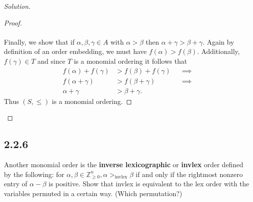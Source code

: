 \documentclass[]{article}
\newcommand\<{\langle}
\renewcommand\>{\rangle}
\newcommand{\ZZ}{\ensuremath{\mathbb{Z}}}
\newenvironment{solution}
{
	\begin{proof}[Solution] \text{ }
		\\
	}
	{
	\end{proof}
}
\begin{document}
\begin{solution}
\begin{proof}
		\\
		\\
		Finally, we show that if $\alpha, \beta, \gamma \in A$ with $\alpha > \beta$ then $\alpha + \gamma > \beta + \gamma$. Again by definition of an order embedding, we must have $f(\alpha) > f(\beta)$. Additionally, $f(\gamma) \in T$ and since $T$ is a monomial ordering it follows that
		\begin{align*}
			f(\alpha) + f(\gamma) &> f(\beta) + f(\gamma) &&\implies \\
			f(\alpha + \gamma) &> f(\beta + \gamma) &&\implies \\
			\alpha + \gamma &> \beta + \gamma.
		\end{align*}
		Thus $(S, \leq)$ is a monomial ordering.
	\end{proof}
	
\end{solution}

\subsection*{2.2.6} Another monomial order is the \textbf{inverse lexicographic} or \textbf{invlex} order defined by the following: for $\alpha, \beta \in \ZZ_{\geq 0}^{n}, \alpha >_{\text{invlex}} \beta$ if and only if the rightmost nonzero entry of $\alpha - \beta$ is positive. Show that invlex is equivalent to the lex order with the variables permuted in a certain way. (Which permutation?)
\end{document}
